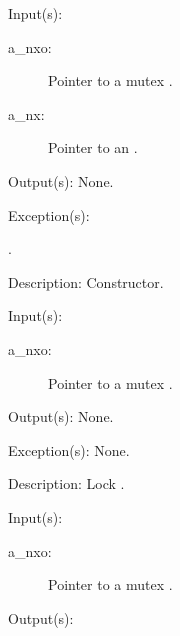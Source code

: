 \begin{capi}
\label{nxo_mutex_new}
	\begin{capilist}
	\item[Input(s): ]
		\begin{description}\item[]
		\item[a\_nxo: ]
			Pointer to a mutex .
		\item[a\_nx: ]
			Pointer to an .
		\end{description}
	\item[Output(s): ] None.
	\item[Exception(s): ]
		\begin{description}\item[]
		\item[.]
		\end{description}
	\item[Description: ]
		Constructor.
	\end{capilist}
\label{nxo_mutex_lock}
	\begin{capilist}
	\item[Input(s): ]
		\begin{description}\item[]
		\item[a\_nxo: ]
			Pointer to a mutex \classname{nxo}.
		\end{description}
	\item[Output(s): ] None.
	\item[Exception(s): ] None.
	\item[Description: ]
		Lock \cvar{a\_nxo}.
	\end{capilist}
\label{nxo_mutex_trylock}
	\begin{capilist}
	\item[Input(s): ]
		\begin{description}\item[]
		\item[a\_nxo: ]
			Pointer to a mutex .
		\end{description}
	\item[Output(s): ]
		\begin{description}\item[]

\end{description}
\end{capilist}
\end{capi}
